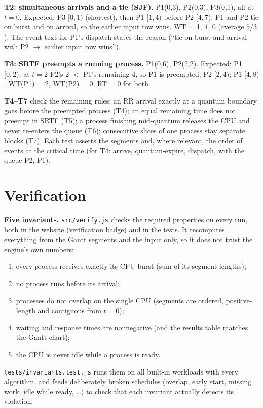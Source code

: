 \documentclass[11pt,a4paper]{article}
\begin{document}
\textbf{T2: simultaneous arrivals and a tie (SJF).} P1(0,3), P2(0,3), P3(0,1), all at $t=0$. Expected: P3 $[0,1)$
(shortest), then P1 $[1,4)$ before P2 $[4,7)$: P1 and P2 tie on burst and on arrival, so the earlier input row wins.
WT = 1, 4, 0 (average $5/3$). The event text for P1's dispatch states the reason (``tie on burst and arrival with P2 $\to$
earlier input row wins'').
\begin{center}\end{center}

\textbf{T3: SRTF preempts a running process.} P1(0,6), P2(2,2). Expected: P1 $[0,2)$; at $t=2$ P2's 2 $<$ P1's
remaining 4, so P1 is preempted; P2 $[2,4)$; P1 $[4,8)$. WT(P1) = 2, WT(P2) = 0, RT = 0 for both.
\begin{center}\end{center}

\textbf{T4--T7} check the remaining rules: an RR arrival exactly at a quantum boundary goes before the preempted
process (T4); an equal remaining time does not preempt in SRTF (T5); a process finishing mid-quantum releases the CPU and
never re-enters the queue (T6); consecutive slices of one process stay separate blocks (T7). Each test asserts the
segments and, where relevant, the order of events at the critical time (for T4: arrive, quantum-expire, dispatch,
with the queue P2, P1).

\section{Verification}\label{sec:verify}

\textbf{Five invariants.} \texttt{src/verify.js} checks the required properties on every run, both in the website
(verification badge) and in the tests. It recomputes everything from the Gantt segments and the input only, so it does not
trust the engine's own numbers:
\begin{enumerate}
  \item every process receives exactly its CPU burst (sum of its segment lengths);
  \item no process runs before its arrival;
  \item processes do not overlap on the single CPU (segments are ordered, positive-length and contiguous from $t=0$);
  \item waiting and response times are nonnegative (and the results table matches the Gantt chart);
  \item the CPU is never idle while a process is ready.
\end{enumerate}
\texttt{tests/invariants.test.js} runs them on all built-in workloads with every algorithm, and feeds deliberately broken
schedules (overlap, early start, missing work, idle while ready, \dots) to check that each invariant actually detects
its violation.
\end{document}
